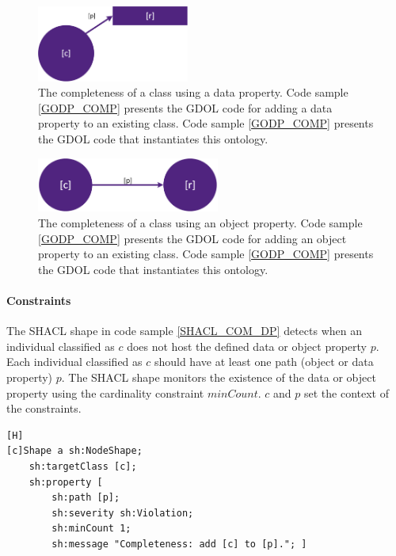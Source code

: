 \begin{figure}[H]
\centering
  \includegraphics[width=5cm]{../../Images/04_Contribution/Completeness_DP.png}
  \caption{The completeness of a class using a data property. Code sample \ref{GODP_COMP} presents the GDOL code for adding a data property to an existing class. Code sample \ref{GODP_COMP} presents the GDOL code that instantiates this ontology.}
  \label{fig:GODP_COMP_DP}
\end{figure} 

\begin{figure}[H]
\centering
  \includegraphics[width=6cm]{../../Images/04_Contribution/Completeness_OP.png}
  \caption{The completeness of a class using an object property. Code sample \ref{GODP_COMP} presents the GDOL code for adding an object property to an existing class. Code sample \ref{GODP_COMP} presents the GDOL code that instantiates this ontology.}
  \label{fig:GODP_COM_OP}
\end{figure} 

\paragraph{Constraints}
The SHACL shape in code sample \ref{SHACL_COM_DP} detects when an individual classified as $c$ does not host the defined data or object property $p$. Each individual classified as $c$ should have at least one path (object or data property) $p$. The SHACL shape monitors the existence of the data or object property using the cardinality constraint $minCount$. $c$ and $p$ set the context of the constraints.

\begin{lstlisting}[float,language=SHACL,caption={The SHACL code that validates if the individuals classified as $c$ host the property $p$. We use the cardinality constraint $sh:minCount$ for this detection: each individual classified as $c$ should have at least one path (object or data property) $p$.},label={SHACL_COM_DP}][H]
[c]Shape a sh:NodeShape;
	sh:targetClass [c]; 
	sh:property [
		sh:path [p]; 
		sh:severity sh:Violation; 
		sh:minCount 1; 
		sh:message "Completeness: add [c] to [p]."; ]
\end{lstlisting}